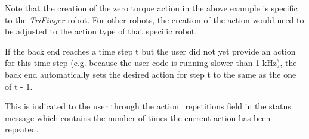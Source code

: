 Note that the creation of the zero torque action in the above example is specific to the {\itshape Tri\+Finger} robot. For other robots, the creation of the action would need to be adjusted to the action type of that specific robot.

If the back end reaches a time step {\ttfamily t} but the user did not yet provide an action for this time step (e.\+g. because the user code is running slower than 1 k\+Hz), the back end automatically sets the desired action for step {\ttfamily t} to the same as the one of {\ttfamily t -\/ 1}.

This is indicated to the user through the {\ttfamily action\+\_\+repetitions} field in the status message which contains the number of times the current action has been repeated. 